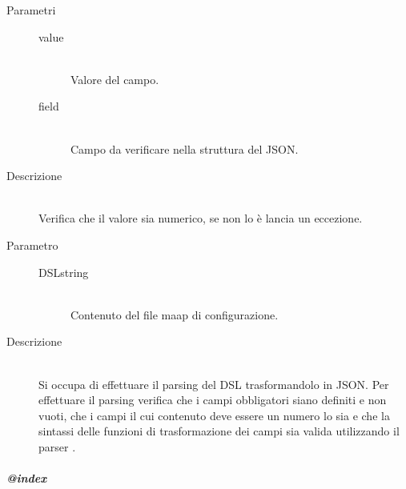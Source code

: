 \begin{description}
\begin{mldescription}
  \hfill
 \begin{description}
     		\item[Parametri] \hfill
     			\begin{description}
     				\item[value] \hfill \\
     				 Valore del campo.
     				\item[field] \hfill \\
     				 Campo da verificare nella struttura del JSON.
     			\end{description}
     		\item[Descrizione] \hfill \\
     		Verifica che il valore sia numerico, se non lo è lancia un eccezione.
   \end{description}
  \hfill
 \begin{description}
     		\item[Parametro] \hfill
     			\begin{description}
     				\item[DSLstring] \hfill \\
     				Contenuto del file maap di configurazione.
     			\end{description}
     		\item[Descrizione] \hfill \\
     		Si occupa di effettuare il parsing del DSL trasformandolo in JSON. Per effettuare il parsing verifica che i campi obbligatori siano definiti e non vuoti, che i campi il cui contenuto deve essere un numero lo sia e che la sintassi delle funzioni di trasformazione dei campi sia valida utilizzando il parser .
   \end{description}
 \end{mldescription}
 
\end{description}
\subparagraph{@index}
